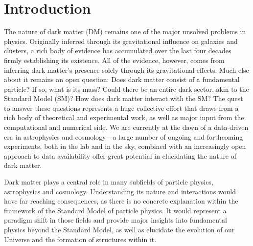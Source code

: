 \chapter{Introduction}
\label{ch:intro}

The nature of dark matter (DM) remains one of the major unsolved problems in physics. Originally inferred through its gravitational influence on galaxies and clusters, a rich body of evidence has accumulated over the last four decades firmly establishing its existence. All of the evidence, however, comes from inferring dark matter's presence solely through its gravitational effects. Much else about it remains an open question: Does dark matter consist  of a fundamental particle? If so, what is its mass? Could there be an entire dark sector, akin to the Standard Model (SM)? How does dark matter interact with the SM? The quest to answer these questions represents a huge collective effort that draws from a rich body of theoretical and experimental work, as well as major input from the computational and numerical side. We are currently at the dawn of a data-driven era in astrophysics and cosmology---a large number of ongoing and forthcoming experiments, both in the lab and in the sky, combined with an increasingly open approach to data availability offer great potential in elucidating the nature of dark matter. 

Dark matter plays a central role in many subfields of particle physics, astrophysics and cosmology. Understanding its nature and interactions would have far reaching consequences, as there is no concrete explanation within the framework of the Standard Model of particle physics. It would represent a paradigm shift in those fields and provide major insights into fundamental physics beyond the Standard Model, as well as elucidate the evolution of our Universe and the formation of structures within it. 


